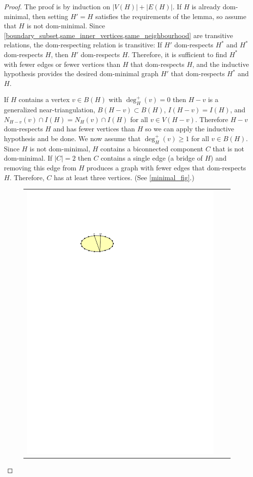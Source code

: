 \documentclass{article}
\theoremstyle{definition}
\begin{document}
\begin{proof}
  The proof is by induction on $|V(H)|+|E(H)|$.  If $H$ is already dom-minimal, then setting $H'=H$ satisfies the requirements of the lemma, so assume that $H$ is not dom-minimal.  Since \cref{boundary_subset,same_inner_vertices,same_neighbourhood} are transitive relations, the dom-respecting relation is transitive: If $H'$ dom-respects $H^*$ and $H^*$ dom-respects $H$, then $H'$ dom-respects $H$.  Therefore, it is sufficient to find $H^*$ with fewer edges or fewer vertices than $H$ that dom-respects $H$, and the inductive hypothesis provides the desired dom-minimal graph $H'$ that dom-respects $H^*$ and $H$.

  If $H$ contains a vertex $v\in B(H)$ with $\deg^+_H(v)=0$ then $H-v$ is a generalized near-triangulation, $B(H-v)\subset B(H)$, $I(H-v)=I(H)$, and $N_{H-v}(v)\cap I(H)=N_{H}(v)\cap I(H)$ for all $v\in V(H-v)$. Therefore $H-v$ dom-respects $H$ and has fewer vertices than $H$ so we can apply the inductive hypothesis and be done.  We now assume that $\deg^+_H(v)\ge 1$ for all $v\in B(H)$. Since $H$ is not dom-minimal, $H$ contains a biconnected component $C$ that is not dom-minimal.  If $|C|=2$ then $C$ contains a single edge (a bridge of $H$) and removing this edge from $H$ produces a graph with fewer edges that dom-respects $H$. Therefore, $C$ has at least three vertices. (See \cref{minimal_fig}.)
  \begin{figure}
    \centering
    \begin{tabular}{ccc}
      \includegraphics[page=1]{figs/minimal} &

\end{tabular}
\end{figure}
\end{proof}
\end{document}
